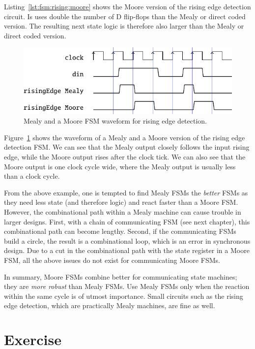 \documentclass[%
    10pt,
    headinclude, footexclude,
    openright, %
    notitlepage,
    cleardoubleempty,
    headsepline,
    pointlessnumbers,
    bibtotoc, idxtotoc,
    ]{scrbook}
\begin{document}
Listing~\ref{lst:fsm:rising:moore} shows the Moore version of the rising edge detection
circuit. Is uses double the number of D flip-flops than the Mealy or direct
coded version. The resulting next state logic is therefore also larger
than the Mealy or direct coded version.

\begin{figure}
  \centering
  \includegraphics[scale=1]{figures/rising}
  \caption{Mealy and a  Moore FSM waveform for rising edge detection.}
  \label{fig:rising}
\end{figure}

Figure~\ref{fig:rising} shows the waveform of a Mealy and a  Moore version
of the rising edge detection FSM. We can see that the Mealy output closely
follows the input rising edge, while the Moore output rises after the clock tick.
We can also see that the Moore output is one clock cycle wide, where the Mealy
output is usually less than a clock cycle.

From the above example, one is tempted to find Mealy FSMs the \emph{better}
FSMs as they need less state (and therefore logic) and react faster than a Moore FSM.
However, the combinational path within a Mealy machine can cause trouble in
larger designs. First, with a chain of communicating FSM (see next chapter), this
combinational path can become lengthy. Second, if the communicating FSMs build
a circle, the result is a combinational loop, which is an error in synchronous design.
Due to a cut in the combinational path with the state register in a Moore FSM,
all the above issues do not exist for communicating Moore FSMs.

In summary, Moore FSMs combine better for communicating state machines; they
are \emph{more robust} than Mealy FSMs. Use Mealy FSMs only when the reaction within the same
cycle is of utmost importance. Small circuits such as the rising edge detection,
which are practically Mealy machines, are fine as well.

\section{Exercise}
\end{document}

